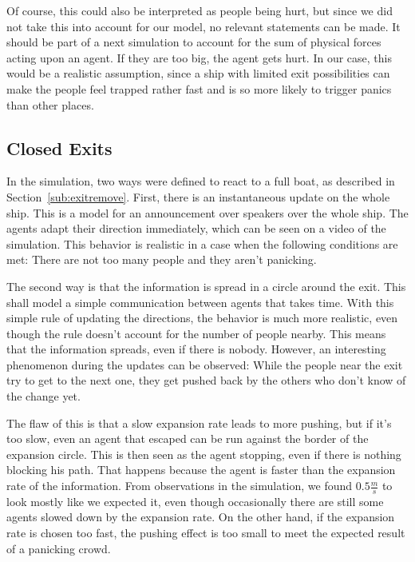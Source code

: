 \documentclass[11pt]{article}
\begin{document}
Of course, this could also be interpreted as people being hurt, but since
we did not take this into account for our model, no relevant statements can
be made. It should be part of a next simulation to account for the sum of 
physical forces acting upon an agent. If they are too big, the agent gets hurt.
In our case, this would be a realistic assumption, since a ship with limited
exit possibilities can make the people feel trapped rather fast and is so more
likely to trigger panics than other places.



\FloatBarrier %
\subsection{Closed Exits} %
\label{sub:Closed exits}

In the simulation, two ways were defined to react to a full boat, as described in Section~\ref{sub:exitremove}.  First, there is an instantaneous update on the whole ship.  This is a model for an
announcement over speakers over the whole ship.  The agents adapt their
direction immediately, which can be seen on a video of the simulation.  This
behavior is realistic in a case when the following conditions are met:
There are not too many people and they aren't panicking.

The second way is that the information is spread in a circle around the exit.
This shall model a simple communication between agents that takes time.  With
this simple rule of updating the directions, the behavior is much more
realistic, even though the rule doesn't account for the number of people
nearby.  This means that the information spreads, even if there is nobody.
However, an interesting phenomenon during the updates can be observed:  While
the people near the exit try to get to the next one, they get pushed back by
the others who don't know of the change yet.

The flaw of this is that a slow expansion rate leads to more pushing, but if
it's too slow, even an agent that escaped can be run against the border of the
expansion circle.  This is then seen as the agent stopping, even if there is
nothing blocking his path. That happens because the agent is faster than the
expansion rate of the information. From observations in the simulation, we
found \(0.5\frac{m}{s}\) to look mostly like we expected it, even though
occasionally there are still some agents slowed down by the expansion rate.
On the other hand, if the expansion rate is chosen too fast, the pushing effect
is too small to meet the expected result of a panicking crowd.
\end{document}
